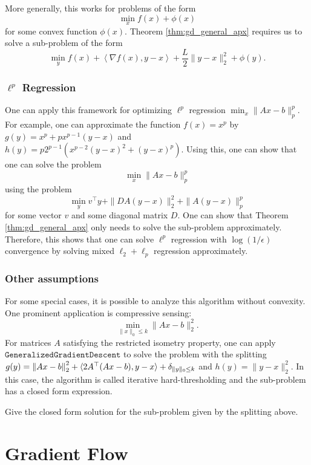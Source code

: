 More generally, this works for problems of the form
\[
\min_{x}f(x)+\phi(x)
\]
for some convex function $\phi(x)$. Theorem \ref{thm:gd_general_apx}
requires us to solve a sub-problem of the form
\[
\min_{y}f(x)+\left\langle \nabla f(x),y-x\right\rangle +\frac{L}{2}\|y-x\|^{2}_{2}+\phi(y).
\]


\subsubsection*{$\ell^{p}$ Regression}

One can apply this framework for optimizing $\ell^{p}$ regression
$\min_{x}\|Ax-b\|^{p}_{p}$. For example, one can approximate the
function $f(x)=x^{p}$ by $g(y)=x^{p}+px^{p-1}(y-x)$ and $h(y)=p2^{p-1}(x^{p-2}(y-x)^{2}+(y-x)^{p})$.
Using this, one can show that one can solve the problem
\[
\min_{x}\|Ax-b\|^{p}_{p}
\]
using the problem
\begin{equation}
\min_{y}v^{\top}y+\|DA(y-x)\|^{2}_{2}+\|A(y-x)\|^{p}_{p}\label{eq:l2lp}
\end{equation}
for some vector $v$ and some diagonal matrix $D$. One can show that
Theorem \ref{thm:gd_general_apx} only needs to solve the sub-problem
approximately. Therefore, this shows that one can solve $\ell^{p}$
regression with $\log(1/\epsilon)$ convergence by solving mixed $\ell_{2}+\ell_{p}$
regression approximately. 

\subsubsection*{Other assumptions}

For some special cases, it is possible to analyze this algorithm without
convexity. One prominent application is compressive sensing: 
\[
\min_{\|x\|_{0}\leq k}\|Ax-b\|^{2}_{2}.
\]
For matrices $A$ satisfying the restricted isometry property, one
can apply $\mathtt{GeneralizedGradientDescent}$ to solve the problem
with the splitting $g(y)=\left\Vert Ax-b\right\Vert^{2}_{2}+\langle2A^{\top}(Ax-b),y-x\rangle+\delta_{\|y\|_{0}\leq k}$
and $h(y)=\|y-x\|^{2}_{2}$. In this case, the algorithm is called
iterative hard-thresholding \cite{blumensath2009iterative} and the
sub-problem has a closed form expression.
\begin{xca}
Give the closed form solution for the sub-problem given by the splitting
above.
\end{xca}


\section{Gradient Flow}

